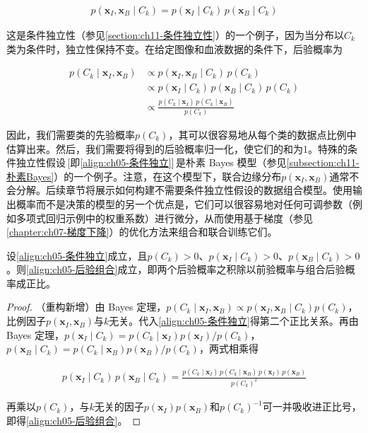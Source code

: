 \documentclass[../../main.tex]{subfiles}
\begin{document}
\begin{enumerate}[(1)]
  \begin{align}
    p(\boldsymbol{x}_{I},\boldsymbol{x}_{B}\mid C_k)=p(\boldsymbol{x}_{I}\mid C_k)\,p(\boldsymbol{x}_{B}\mid C_k)
    \label{align:ch05-条件独立}
  \end{align}

  这是条件独立性（参见\cref{section:ch11-条件独立性}）的一个例子，因为当分布以$C_k$类为条件时，独立性保持不变。在给定图像和血液数据的条件下，后验概率为

  \begin{align}
    p(C_k\mid\boldsymbol{x}_{I},\boldsymbol{x}_{B})&\propto p(\boldsymbol{x}_{I},\boldsymbol{x}_{B}\mid C_k)\,p(C_k)\nonumber\\
    &\propto p(\boldsymbol{x}_{I}\mid C_k)\,p(\boldsymbol{x}_{B}\mid C_k)\,p(C_k)\nonumber\\
    &\propto \frac{p(C_k\mid\boldsymbol{x}_{I})\,p(C_k\mid\boldsymbol{x}_{B})}{p(C_k)}
    \label{align:ch05-后验组合}
  \end{align}
\end{enumerate}

因此，我们需要类的先验概率$p(C_k)$，其可以很容易地从每个类的数据点比例中估算出来。然后，我们需要将得到的后验概率归一化，使它们的和为1。特殊的条件独立性假设\,[即\eqref{align:ch05-条件独立}]\,是朴素 Bayes 模型（参见\cref{subsection:ch11-朴素Bayes}）的一个例子。注意，在这个模型下，联合边缘分布$p(\boldsymbol{x}_{I},\boldsymbol{x}_{B})$通常不会分解。后续章节将展示如何构建不需要条件独立性假设的数据组合模型。使用输出概率而不是决策的模型的另一个优点是，它们可以很容易地对任何可调参数（例如多项式回归示例中的权重系数）进行微分，从而使用基于梯度（参见\cref{chapter:ch07-梯度下降}）的优化方法来组合和联合训练它们。

\begin{proposition}[条件独立性下的后验组合]\label{proposition:ch05-后验组合}
设\eqref{align:ch05-条件独立}成立，且$p(C_k)>0$、$p(\boldsymbol{x}_{I}\mid C_k)>0$、$p(\boldsymbol{x}_{B}\mid C_k)>0$。则\eqref{align:ch05-后验组合}成立，即两个后验概率之积除以前验概率与组合后验概率成正比。
\end{proposition}

\begin{proof}
（重构新增）由 Bayes 定理，$p(C_k\mid\boldsymbol{x}_{I},\boldsymbol{x}_{B})\propto p(\boldsymbol{x}_{I},\boldsymbol{x}_{B}\mid C_k)p(C_k)$，比例因子$p(\boldsymbol{x}_{I},\boldsymbol{x}_{B})$与$k$无关。代入\eqref{align:ch05-条件独立}得第二个正比关系。再由 Bayes 定理，$p(\boldsymbol{x}_{I}\mid C_k)=p(C_k\mid\boldsymbol{x}_{I})p(\boldsymbol{x}_{I})/p(C_k)$，$p(\boldsymbol{x}_{B}\mid C_k)=p(C_k\mid\boldsymbol{x}_{B})p(\boldsymbol{x}_{B})/p(C_k)$，两式相乘得

\begin{align}
  p(\boldsymbol{x}_{I}\mid C_k)\,p(\boldsymbol{x}_{B}\mid C_k)=\frac{p(C_k\mid\boldsymbol{x}_{I})\,p(C_k\mid\boldsymbol{x}_{B})\,p(\boldsymbol{x}_{I})\,p(\boldsymbol{x}_{B})}{p(C_k)^{2}}
\end{align}

再乘以$p(C_k)$，与$k$无关的因子$p(\boldsymbol{x}_{I})p(\boldsymbol{x}_{B})$和$p(C_k)^{-1}$可一并吸收进正比号，即得\eqref{align:ch05-后验组合}。
\end{proof}
\end{document}
